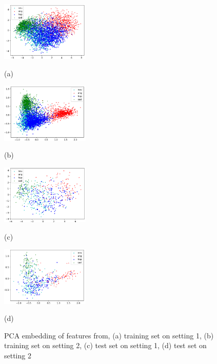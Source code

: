 \documentclass{article}
\begin{document}
\begin{figure}[htb]
	\begin{minipage}[b]{.48\linewidth}
		\centering
		\centerline{\includegraphics[width=4.2cm]{train_lambda0.png}}
		\centerline{(a)  }\medskip
	\end{minipage}
	\hfill
	\begin{minipage}[b]{0.48\linewidth}
		\centering
		\centerline{\includegraphics[width=4.2cm]{train_lambda03.png}}
		\centerline{(b)}\medskip
	\end{minipage}
	
	\begin{minipage}[b]{.48\linewidth}
		\centering
		\centerline{\includegraphics[width=4.2cm]{test_lambda0.png}}
		\centerline{(c)  }\medskip
	\end{minipage}
	\hfill
	\begin{minipage}[b]{0.48\linewidth}
		\centering
		\centerline{\includegraphics[width=4.2cm]{test_lambda03.png}}
		\centerline{(d)}\medskip
	\end{minipage}
	\caption{PCA embedding of features from, (a) training set on setting 1, (b) training set on setting 2, (c) test set on setting 1, (d) test set on setting 2}
	\label{fig:pca}
\end{figure}
\end{document}
